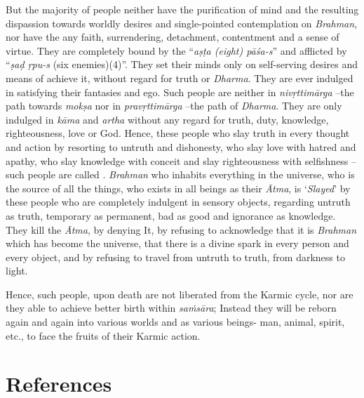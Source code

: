 But the majority of people neither have the purification of mind and the resulting dispassion towards worldly desires and single-pointed contemplation on \emph{Brahman}, nor have the any faith, surrendering, detachment, contentment and a sense of virtue. They are completely bound by the ``\emph{aṣṭa (eight) pāśa-s}'' and afflicted by ``\emph{ṣaḍ ṛpu-s} (six enemies)(4)''. They set their minds only on self-serving desires and means of achieve it, without regard for truth or \emph{Dharma}. They are ever indulged in satisfying their fantasies and ego. Such people are neither in \emph{nivṛttimārga} --the path towards \emph{mokṣa} nor in \emph{pravṛttimārga} --the path of \emph{Dharma}. They are only indulged in \emph{kāma} and \emph{artha} without any regard for truth, duty, knowledge, righteousness, love or God. Hence, these people who slay truth in every thought and action by resorting to untruth and dishonesty, who slay love with hatred and apathy, who slay knowledge with conceit and slay righteousness with selfishness --such people are called . \emph{Brahman} who inhabits everything in the universe, who is the source of all the things, who exists in all beings as their \emph{Ātma}, is `\emph{Slayed}' by these people who are completely indulgent in sensory objects, regarding untruth as truth, temporary as permanent, bad as good and ignorance as knowledge. They kill the \emph{Ātma}, by denying It, by refusing to acknowledge that it is \emph{Brahman} which has become the universe, that there is a divine spark in every person and every object, and by refusing to travel from untruth to truth, from darkness to light.

Hence, such people, upon death are not liberated from the Karmic cycle, nor are they able to achieve better birth within \emph{saṁsāra}; Instead they will be reborn again and again into various worlds and as various beings- man, animal, spirit, etc., to face the fruits of their Karmic action.

\section*{References}

